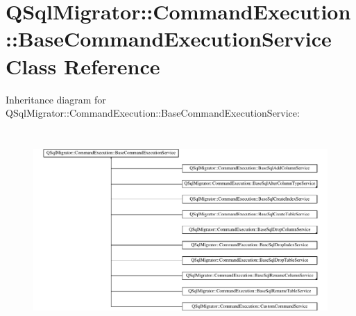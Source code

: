 \hypertarget{class_q_sql_migrator_1_1_command_execution_1_1_base_command_execution_service}{}\section{Q\+Sql\+Migrator\+:\+:Command\+Execution\+:\+:Base\+Command\+Execution\+Service Class Reference}
\label{class_q_sql_migrator_1_1_command_execution_1_1_base_command_execution_service}
Inheritance diagram for Q\+Sql\+Migrator\+:\+:Command\+Execution\+:\+:Base\+Command\+Execution\+Service\+:\begin{figure}[H]
\begin{center}
\leavevmode
\includegraphics[height=7.642680cm]{class_q_sql_migrator_1_1_command_execution_1_1_base_command_execution_service}
\end{center}
\end{figure}

